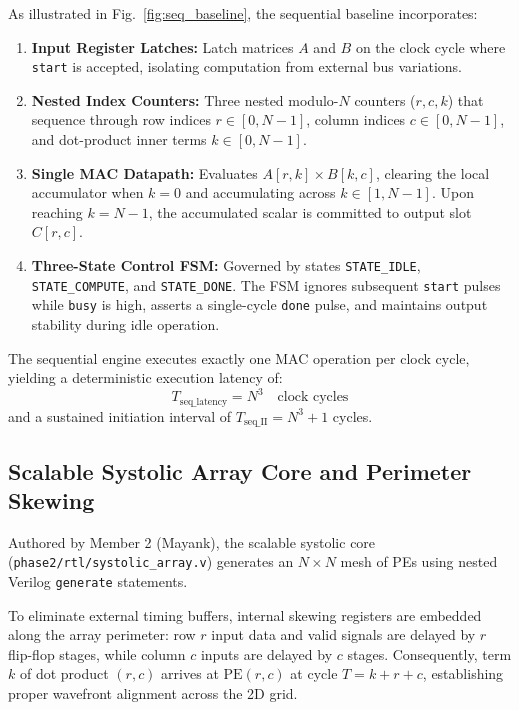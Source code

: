 \documentclass[conference]{IEEEtran}
\begin{document}
As illustrated in Fig.~\ref{fig:seq_baseline}, the sequential baseline incorporates:
\begin{enumerate}
    \item \textbf{Input Register Latches:} Latch matrices $A$ and $B$ on the clock cycle where \texttt{start} is accepted, isolating computation from external bus variations.
    \item \textbf{Nested Index Counters:} Three nested modulo-$N$ counters ($r, c, k$) that sequence through row indices $r \in [0, N-1]$, column indices $c \in [0, N-1]$, and dot-product inner terms $k \in [0, N-1]$.
    \item \textbf{Single MAC Datapath:} Evaluates $A[r,k] \times B[k,c]$, clearing the local accumulator when $k=0$ and accumulating across $k \in [1, N-1]$. Upon reaching $k=N-1$, the accumulated scalar is committed to output slot $C[r,c]$.
    \item \textbf{Three-State Control FSM:} Governed by states \texttt{STATE\_IDLE}, \texttt{STATE\_COMPUTE}, and \texttt{STATE\_DONE}. The FSM ignores subsequent \texttt{start} pulses while \texttt{busy} is high, asserts a single-cycle \texttt{done} pulse, and maintains output stability during idle operation.
\end{enumerate}
The sequential engine executes exactly one MAC operation per clock cycle, yielding a deterministic execution latency of:
\begin{equation}
T_{\text{seq\_latency}} = N^3 \quad \text{clock cycles}
\end{equation}
and a sustained initiation interval of $T_{\text{seq\_II}} = N^3 + 1$ cycles.

\subsection{Scalable Systolic Array Core and Perimeter Skewing}
Authored by Member 2 (Mayank), the scalable systolic core (\texttt{phase2/rtl/systolic\_array.v}) generates an $N \times N$ mesh of PEs using nested Verilog \texttt{generate} statements. 

To eliminate external timing buffers, internal skewing registers are embedded along the array perimeter: row $r$ input data and valid signals are delayed by $r$ flip-flop stages, while column $c$ inputs are delayed by $c$ stages. Consequently, term $k$ of dot product $(r, c)$ arrives at $\text{PE}(r, c)$ at cycle $T = k + r + c$, establishing proper wavefront alignment across the 2D grid.
\end{document}
